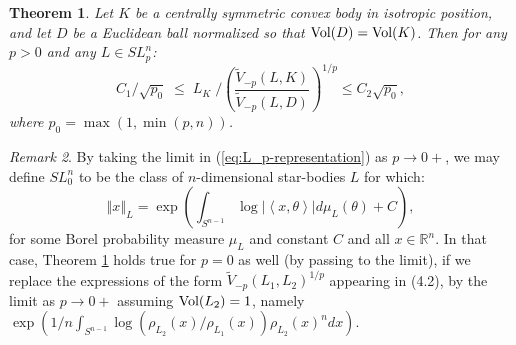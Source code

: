 \documentclass[12pt,oneside]{amsart}
\newtheorem{thm}{Theorem}[section] %
\theoremstyle{definition}
\theoremstyle{remark}
\newtheorem{rem}[thm]{Remark}
\theoremstyle{proof}
\numberwithin{equation}{section}
\newcommand{\norm}[1]{\left\Vert#1\right\Vert}
\newcommand{\abs}[1]{\left\vert#1\right\vert}
\newcommand{\brac}[1]{\left(#1\right)}
\newcommand{\scalar}[1]{\left \langle #1 \right \rangle}
\newcommand{\abscalar}[1]{\abs{\scalar{#1}}}
\newcommand{\Real}{\mathbb{R}}
\newcommand{\Vol}[1]{\textnormal{Vol} (#1)}
\newcommand{\VolRatio}[2]{\brac{\frac{\Vol{#1}}{\Vol{#2}}}^{1/n}}
\begin{document}
\begin{thm} \label{thm:main1-basic}
Let $K$ be a centrally symmetric convex body in isotropic
position, and let $D$ be a Euclidean ball normalized so that
$\Vol{D} = \Vol{K}$. Then for any $p > 0$ and any $L \in SL_p^n$:
\begin{equation} \label{eq:main1-basic}
C_1 / \sqrt{p_0} \; \leq \; L_K \; / \brac{ \frac{
\widetilde{V}_{-p}(L,K) } {\widetilde{V}_{-p}(L,D)}}^{1/p} \leq
C_2 \sqrt{p_0},
\end{equation}
where $p_0 = \max(1,\min(p,n))$.
\end{thm}


\begin{rem}
By taking the limit in (\ref{eq:L_p-representation}) as
$p\rightarrow 0+$, we may define $SL_0^n$ to be the class of
$n$-dimensional star-bodies $L$ for which:
\[
\norm{x}_L = \exp\brac{\int_{S^{n-1}} \log \abscalar{x,\theta}
d\mu_L(\theta) + C},
\]
for some Borel probability measure $\mu_L$ and constant $C$ and
all $x\in \Real^n$. In that case, Theorem \ref{thm:main1-basic}
holds true for $p=0$ as well (by passing to the limit), if we
replace the expressions of the form
$\widetilde{V}_{-p}(L_1,L_2)^{1/p}$ appearing in (4.2), by the
limit as $p \rightarrow 0+$ assuming $\Vol{L_2} = 1$, namely
$\exp\brac{1/n \int_{S^{n-1}} \log(\rho_{L_2}(x) / \rho_{L_1}(x))
\rho_{L_2}(x)^n dx}$.
\end{rem}

\end{document}
